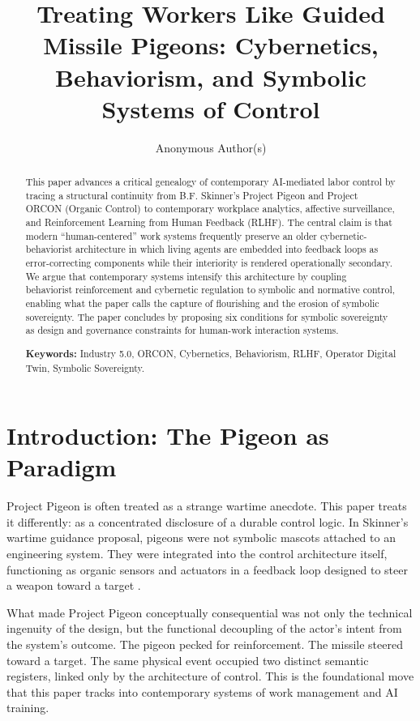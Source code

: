 \documentclass[11pt, a4paper]{article}
\title{Treating Workers Like Guided Missile Pigeons: Cybernetics, Behaviorism, and Symbolic Systems of Control}
\author{Anonymous Author(s)}
\affil{Working Draft for HWID 2026 (orcon-d)}
\date{}
\begin{document}
\maketitle

\begin{abstract}
This paper advances a critical genealogy of contemporary AI-mediated labor control by tracing a structural continuity from B.F. Skinner's Project Pigeon and Project ORCON (Organic Control) to contemporary workplace analytics, affective surveillance, and Reinforcement Learning from Human Feedback (RLHF). The central claim is that modern ``human-centered'' work systems frequently preserve an older cybernetic-behaviorist architecture in which living agents are embedded into feedback loops as error-correcting components while their interiority is rendered operationally secondary. We argue that contemporary systems intensify this architecture by coupling behaviorist reinforcement and cybernetic regulation to symbolic and normative control, enabling what the paper calls the capture of flourishing and the erosion of symbolic sovereignty. The paper concludes by proposing six conditions for symbolic sovereignty as design and governance constraints for human-work interaction systems.

\textbf{Keywords:} Industry 5.0, ORCON, Cybernetics, Behaviorism, RLHF, Operator Digital Twin, Symbolic Sovereignty.
\end{abstract}

\section{Introduction: The Pigeon as Paradigm}

Project Pigeon is often treated as a strange wartime anecdote. This paper treats it differently: as a concentrated disclosure of a durable control logic. In Skinner's wartime guidance proposal, pigeons were not symbolic mascots attached to an engineering system. They were integrated into the control architecture itself, functioning as organic sensors and actuators in a feedback loop designed to steer a weapon toward a target \cite{skinner1960pigeons,capshew1993engineering}.

What made Project Pigeon conceptually consequential was not only the technical ingenuity of the design, but the functional decoupling of the actor's intent from the system's outcome. The pigeon pecked for reinforcement. The missile steered toward a target. The same physical event occupied two distinct semantic registers, linked only by the architecture of control. This is the foundational move that this paper tracks into contemporary systems of work management and AI training.
\end{document}
